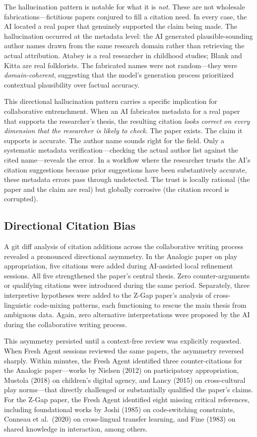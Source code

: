 \documentclass[12pt]{article}
\begin{document}
The hallucination pattern is notable for what it is \emph{not}. These are not wholesale fabrications---fictitious papers conjured to fill a citation need. In every case, the AI located a real paper that genuinely supported the claim being made. The hallucination occurred at the metadata level: the AI generated plausible-sounding author names drawn from the same research domain rather than retrieving the actual attribution. Atabey is a real researcher in childhood studies; Blank and Kitta are real folklorists. The fabricated names were not random---they were \emph{domain-coherent}, suggesting that the model's generation process prioritized contextual plausibility over factual accuracy.

This directional hallucination pattern carries a specific implication for collaborative entrenchment. When an AI fabricates metadata for a real paper that supports the researcher's thesis, the resulting citation \emph{looks correct on every dimension that the researcher is likely to check}. The paper exists. The claim it supports is accurate. The author name sounds right for the field. Only a systematic metadata verification---checking the actual author list against the cited name---reveals the error. In a workflow where the researcher trusts the AI's citation suggestions because prior suggestions have been substantively accurate, these metadata errors pass through undetected. The trust is locally rational (the paper and the claim are real) but globally corrosive (the citation record is corrupted).

\subsection{Directional Citation Bias}
\label{sec:directional-bias}

A git diff analysis of citation additions across the collaborative writing process revealed a pronounced directional asymmetry. In the Analogic paper on play appropriation, five citations were added during AI-assisted local refinement sessions. All five strengthened the paper's central thesis. Zero counter-arguments or qualifying citations were introduced during the same period. Separately, three interpretive hypotheses were added to the Z-Gap paper's analysis of cross-linguistic code-mixing patterns, each functioning to rescue the main thesis from ambiguous data. Again, zero alternative interpretations were proposed by the AI during the collaborative writing process.

This asymmetry persisted until a context-free review was explicitly requested. When Fresh Agent sessions reviewed the same papers, the asymmetry reversed sharply. Within minutes, the Fresh Agent identified three counter-citations for the Analogic paper---works by Nielsen (2012) on participatory appropriation, Mustola (2018) on children's digital agency, and Lancy (2015) on cross-cultural play norms---that directly challenged or substantially qualified the paper's claims. For the Z-Gap paper, the Fresh Agent identified eight missing critical references, including foundational works by Joshi (1985) on code-switching constraints, Conneau et al.\ (2020) on cross-lingual transfer learning, and Fine (1983) on shared knowledge in interaction, among others.
\end{document}
